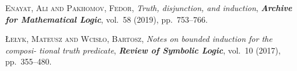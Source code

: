 \documentclass[bsl,meeting]{asl}
\begin{document}
\begin{thebibliography}{10}

{\scshape Enayat, Ali and Pakhomov, Fedor},
{\itshape Truth, disjunction, and induction},
{\bfseries\itshape Archive for
Mathematical Logic},
vol.~58 (2019), pp.~753--766.

{\scshape \L{}e\l{}yk, Mateusz and Wcis\l{}o, Bartosz},
{\itshape Notes on bounded induction for the composi-
tional truth predicate},
{\bfseries\itshape Review of Symbolic Logic},
vol.~10 (2017), pp.~355--480.

\end{thebibliography}


\vspace*{-0.5\baselineskip}
\end{document}
